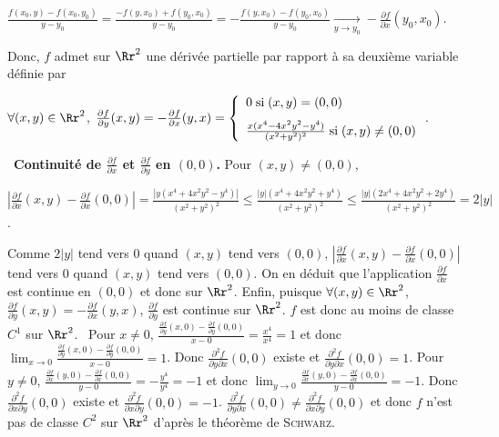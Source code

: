 {{\begin{center}
$\frac{f(x_0,y)-f(x_0,y_0)}{y-y_0}=\frac{-f(y,x_0)+f(y_0,x_0)}{y-y_0}=-\frac{f(y,x_0)-f(y_0,x_0)}{y-y_0}\underset{y\rightarrow y_0}{\rightarrow}-\frac{\partial f}{\partial x}(y_0,x_0)$.
\end{center}
Donc, $f$ admet sur $\Rr^2$ une dérivée partielle par rapport à sa deuxième variable définie par 

\begin{center}
$\forall(x,y)\in\Rr^2$, $\frac{\partial f}{\partial y}(x,y)=-\frac{\partial f}{\partial x}(y,x)=\left\{
\begin{array}{l}
\rule[-4mm]{0mm}{0mm}0\;\text{si}\;(x,y)=(0,0)\\
\frac{x(x^4-4x^2y^2-y^4)}{(x^2+y^2)^2}\;\text{si}\;(x,y)\neq(0,0)
\end{array}
\right.$.
\end{center}
\textbullet~\textbf{Continuité de $\frac{\partial f}{\partial x}$ et $\frac{\partial f}{\partial y}$ en $(0,0)$.} Pour $(x,y)\neq(0,0)$,

\begin{center}
$\left|\frac{\partial f}{\partial x}(x,y)-\frac{\partial f}{\partial x}(0,0)\right|=\frac{|y(x^4+4x^2y^2-y^4)|}{(x^2+y^2)^2}\leqslant\frac{|y|(x^4+4x^2y^2+y^4)}{(x^2+y^2)^2}\leqslant\frac{|y|(2x^4+4x^2y^2+2y^4)}{(x^2+y^2)^2}=2|y|$.
\end{center}
Comme $2|y|$ tend vers $0$ quand $(x,y)$ tend vers $(0,0)$, $\left|\frac{\partial f}{\partial x}(x,y)-\frac{\partial f}{\partial x}(0,0)\right|$ tend vers $0$ quand $(x,y)$ tend vers $(0,0)$. On en déduit que l'application $\frac{\partial f}{\partial x}$ est continue en $(0,0)$ et donc sur $\Rr^2$.
Enfin, puisque $\forall(x,y)\in\Rr^2$, $\frac{\partial f}{\partial y}(x,y)=-\frac{\partial f}{\partial x}(y,x)$, $\frac{\partial f}{\partial y}$ est continue sur $\Rr^2$. $f$ est donc au moins de classe $C^1$ sur $\Rr^2$.
\textbullet~Pour $x\neq0$, $\frac{\frac{\partial f}{\partial y}(x,0)-\frac{\partial f}{\partial y}(0,0)}{x-0}=\frac{x^4}{x^4}=1$ et donc $\lim_{x\rightarrow 0}\frac{\frac{\partial f}{\partial y}(x,0)-\frac{\partial f}{\partial y}(0,0)}{x-0}=1$. Donc $\frac{\partial^2f}{\partial y\partial x}(0,0)$ existe et $\frac{\partial^2f}{\partial y\partial x}(0,0)=1$.
Pour $y\neq0$, $\frac{\frac{\partial f}{\partial x}(y,0)-\frac{\partial f}{\partial x}(0,0)}{y-0}=-\frac{y^4}{y^4}=-1$ et donc $\lim_{y\rightarrow 0}\frac{\frac{\partial f}{\partial x}(y,0)-\frac{\partial f}{\partial x}(0,0)}{y-0}=-1$. Donc $\frac{\partial^2f}{\partial x\partial y}(0,0)$ existe et $\frac{\partial^2f}{\partial x\partial y}(0,0)=-1$.
$\frac{\partial^2f}{\partial y\partial x}(0,0)\neq\frac{\partial^2f}{\partial x\partial y}(0,0)$ et donc $f$ n'est pas de classe $C^2$ sur $\Rr^2$ d'après le théorème de \textsc{Schwarz}.

\begin{center}
\end{center}
}
}
